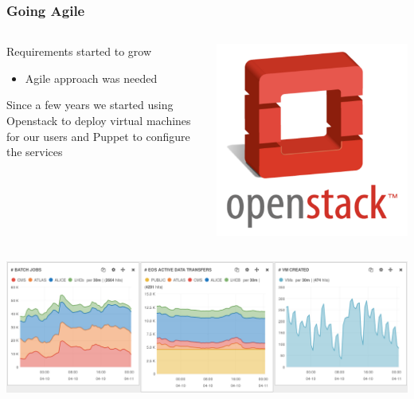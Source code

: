\documentclass{beamer}
\begin{document}
\begin{frame}
    \frametitle{Going Agile}
    \begin{minipage}[t]{0.95\textwidth}
        \begin{columns}
            \begin{column}{0.7\textwidth}
                Requirements started to grow
                \begin{itemize}
                    \item Agile approach was needed
                \end{itemize}
                \vspace{0.2in} 
                Since a few years we started using Openstack to deploy virtual machines for our users and Puppet to configure the services 
            \end{column}
            \begin{column}{0.3\textwidth}
                \includegraphics[width=1\textwidth]{openstack-logo512.png}
            \end{column}
        \end{columns}
    \end{minipage}
    \vspace{\belowdisplayskip}
    \begin{minipage}[t]{0.95\textwidth}
        \includegraphics[width=1.1\textwidth]{Eos-CreatedVm.png}
    \end{minipage}
\end{frame}
\end{document}
